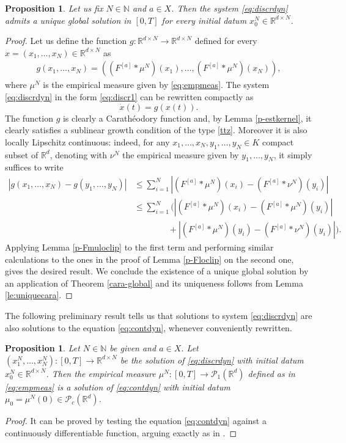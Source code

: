 \documentclass[A4paper,11pt]{article}
\newtheorem{proposition}[theorem]{Proposition}
\theoremstyle{definition}
\newcommand{\N}{\mathbb{N}}
\newcommand{\R}{\mathbb{R}}
\newcommand{\PP}{\mathcal{P}_1}
\newcommand{\PC}{\mathcal{P}_c}
\newcommand{\Fun}[1]{F^{[#1]}}
\begin{document}
\begin{proposition} Let us fix  $N \in \mathbb N$ and  $a \in X$. Then the system \eqref{eq:discrdyn} admits a unique global solution in $[0,T]$ for every initial datum $x^{N}_0 \in \R^{d \times N}$.
\end{proposition}
\begin{proof}
Let us define  the
 function $g:\R^{d \times N} \rightarrow \R^{d \times N}$ defined for every $x=(x_1, \ldots, x_N)\in \R^{d \times N}$ as
\begin{align*}
g(x_1, \ldots, x_N) = ((\Fun{a}*\mu^N)(x_1),\ldots,(\Fun{a}*\mu^N)(x_N)),
\end{align*}
where $\mu^N$ is the empirical measure given by \eqref{eq:empmeas}. The system \eqref{eq:discrdyn} in the form \eqref{eq:discr1} can be rewritten compactly as
$$
\dot x (t) = g(x(t)).
$$
The function $g$ is clearly a  Carath{\'e}odory function and, by Lemma \ref{p-estkernel}, it clearly satisfies a sublinear growth condition of the type \eqref{ttz}. Moreover it is also locally Lipschitz continuous: indeed, for any $x_1, \ldots, x_N, y_1, \ldots, y_N \in K$ compact subset of $\R^d$, denoting with $\nu^N$ the empirical measure given by $y_1, \ldots, y_N$, it simply suffices to write
\begin{align*}
|g(x_1, \ldots, x_N) - g(y_1,\ldots,y_N)| &\leq \sum^N_{i = 1} |(\Fun{a}*\mu^N)(x_i) - (\Fun{a}*\nu^N)(y_i)| \\
&\leq \sum^N_{i = 1} \Bigg( |(\Fun{a}*\mu^N)(x_i) - (\Fun{a}*\mu^N)(y_i)| \\
&\quad \quad \quad \quad +|(\Fun{a}*\mu^N)(y_i) - (\Fun{a}*\nu^N)(y_i)| \Bigg).
\end{align*}
Applying Lemma \ref{p-Fmuloclip} to the first term and performing similar calculations to the ones in the proof of Lemma \ref{p-Floclip} on the second one, gives the desired result. We conclude the existence of a unique global solution by an application of Theorem \ref{cara-global} and its uniqueness follows from Lemma \ref{le:uniquecara}.
\end{proof}

The following preliminary result tells us that solutions to system \eqref{eq:discrdyn} are also solutions to the equation \eqref{eq:contdyn}, whenever conveniently rewritten.

\begin{proposition}\label{p-rewritten}
Let $N \in \N$ be given and $a \in X$. Let $(x^N_1, \ldots, x^N_N):[0,T] \rightarrow \R^{d\times N}$ be the solution of \eqref{eq:discrdyn} with initial datum $x^{N}_0 \in \R^{d \times N}$. Then the empirical measure $\mu^N:[0,T] \rightarrow \PP(\R^d)$ defined as in \eqref{eq:empmeas} is a solution of \eqref{eq:contdyn} with initial datum $\mu_{0}= \mu^N(0) \in \PC(\R^d)$.
\end{proposition}
\begin{proof}
It can be  proved by testing the equation  \eqref{eq:contdyn}  against a continuously differentiable function, arguing exactly as in \cite[Lemma 4.3]{MFOC}.
\end{proof}
\end{document}
